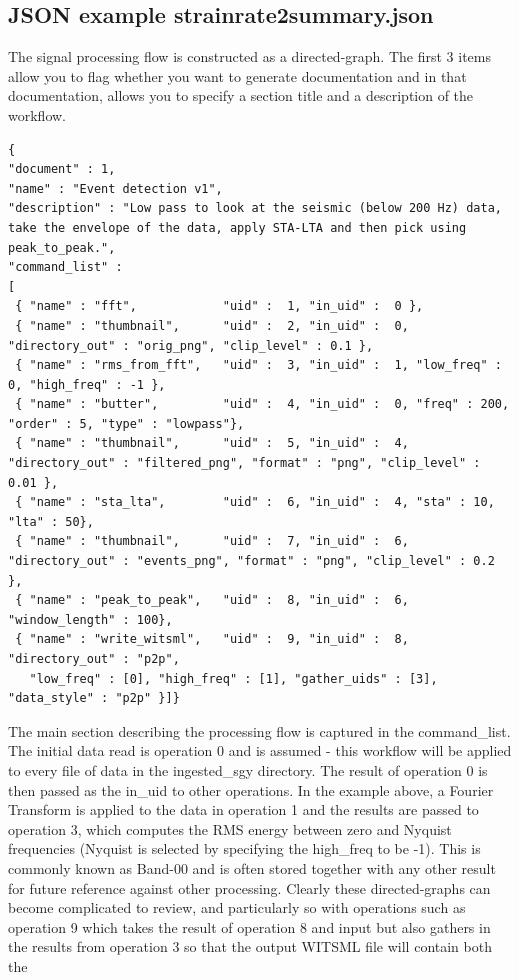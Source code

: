 \subsection{JSON example strainrate2summary.json}
The signal processing flow is constructed as a directed-graph.
The first 3 items allow you to flag whether you want to generate documentation and in that documentation, allows you to specify
a section title and a description of the workflow.
\begin{lstlisting}
{
"document" : 1,
"name" : "Event detection v1",
"description" : "Low pass to look at the seismic (below 200 Hz) data, take the envelope of the data, apply STA-LTA and then pick using peak_to_peak.",
"command_list" :
[ 
 { "name" : "fft",            "uid" :  1, "in_uid" :  0 },
 { "name" : "thumbnail",      "uid" :  2, "in_uid" :  0, "directory_out" : "orig_png", "clip_level" : 0.1 },
 { "name" : "rms_from_fft",   "uid" :  3, "in_uid" :  1, "low_freq" : 0, "high_freq" : -1 },
 { "name" : "butter",         "uid" :  4, "in_uid" :  0, "freq" : 200, "order" : 5, "type" : "lowpass"},
 { "name" : "thumbnail",      "uid" :  5, "in_uid" :  4, "directory_out" : "filtered_png", "format" : "png", "clip_level" : 0.01 },
 { "name" : "sta_lta",        "uid" :  6, "in_uid" :  4, "sta" : 10, "lta" : 50},
 { "name" : "thumbnail",      "uid" :  7, "in_uid" :  6, "directory_out" : "events_png", "format" : "png", "clip_level" : 0.2 },
 { "name" : "peak_to_peak",   "uid" :  8, "in_uid" :  6, "window_length" : 100},
 { "name" : "write_witsml",   "uid" :  9, "in_uid" :  8, "directory_out" : "p2p", 
   "low_freq" : [0], "high_freq" : [1], "gather_uids" : [3], "data_style" : "p2p" }]}
\end{lstlisting}
The main section describing the processing flow is captured in the command\_list.
The initial data read is operation 0 and is assumed - this workflow will be applied to every file of data in the ingested\_sgy directory.
The result of operation 0 is then passed as the in\_uid to other operations. In the example above, a Fourier Transform is applied to the data
in operation 1 and the results are passed to operation 3, which computes the RMS energy between zero and Nyquist frequencies (Nyquist is selected
by specifying the high\_freq to be -1). This is commonly known as Band-00 and is often stored together with any other result for future
reference against other processing.
Clearly these directed-graphs can become complicated to review, and particularly so with operations such as operation 9 which takes 
the result of operation 8 and input but also gathers in the results from operation 3 so that the output WITSML file will contain both the 
